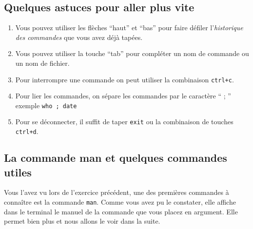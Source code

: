 \documentclass{article}
\begin{document}
\subsection{Quelques astuces pour aller plus vite}

\begin{enumerate}
\item
  Vous pouvez utiliser les flèches ``haut'' et ``bas'' pour faire
  défiler l'\emph{historique des commandes} que vous avez déjà tapées.

\item
  Vous pouvez utiliser la touche ``tab'' pour compléter un nom de
  commande ou un nom de fichier.
  
\item
  Pour interrompre une commande on peut utiliser la combinaison \texttt{ctrl+c}.
  
\item
  Pour lier les commandes, on sépare les commandes par le caractère `` ; ''
  exemple \texttt{who ; date}

\item
 Pour se déconnecter, il suffit de taper \texttt{exit} ou la combinaison de touches \texttt{ctrl+d}.

\end{enumerate}

\subsection{La commande man et quelques commandes utiles}

Vous l'avez vu lors de l'exercice précédent, une des premières commandes à connaître est la commande \texttt{man}.
Comme vous avez pu le constater, elle affiche dans le terminal le manuel de la commande que vous placez en argument.
Elle permet bien plus et nous allons le voir dans la suite.
\end{document}
